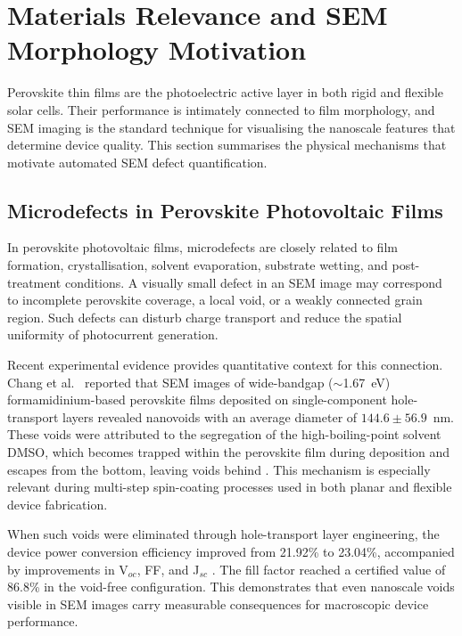 \documentclass[pdflatex,sn-mathphys-num,iicol]{sn-jnl}
\theoremstyle{thmstyleone}
\theoremstyle{thmstyletwo}
\theoremstyle{thmstylethree}
\begin{document}

\section{Materials Relevance and SEM Morphology Motivation}
\label{sec:materials_relevance}

Perovskite thin films are the photoelectric active layer in both
rigid and flexible solar cells. Their performance is intimately
connected to film morphology, and SEM imaging is the standard
technique for visualising the nanoscale features that determine
device quality. This section summarises the physical mechanisms
that motivate automated SEM defect quantification.

\subsection{Microdefects in Perovskite Photovoltaic Films}
\label{subsec:microdefects}

In perovskite photovoltaic films, microdefects are closely related to
film formation, crystallisation, solvent evaporation, substrate
wetting, and post-treatment conditions. A visually small defect in an
SEM image may correspond to incomplete perovskite coverage, a local
void, or a weakly connected grain region. Such defects can disturb
charge transport and reduce the spatial uniformity of photocurrent
generation.

Recent experimental evidence provides quantitative context for this
connection. Chang et al.\ \cite{chang2026} reported that SEM images
of wide-bandgap ($\sim$1.67~eV) formamidinium-based perovskite films
deposited on single-component hole-transport layers revealed nanovoids
with an average diameter of $144.6 \pm 56.9$~nm. These voids were
attributed to the segregation of the high-boiling-point solvent DMSO,
which becomes trapped within the perovskite film during deposition and
escapes from the bottom, leaving voids behind
\cite{chang2026,chen2021}. This mechanism is especially relevant
during multi-step spin-coating processes used in both planar and
flexible device fabrication.

When such voids were eliminated through hole-transport layer
engineering, the device power conversion efficiency improved from
21.92\% to 23.04\%, accompanied by improvements in V$_{oc}$, FF,
and J$_{sc}$ \cite{chang2026}. The fill factor reached a certified
value of 86.8\% in the void-free configuration. This demonstrates
that even nanoscale voids visible in SEM images carry measurable
consequences for macroscopic device performance.
\end{document}
